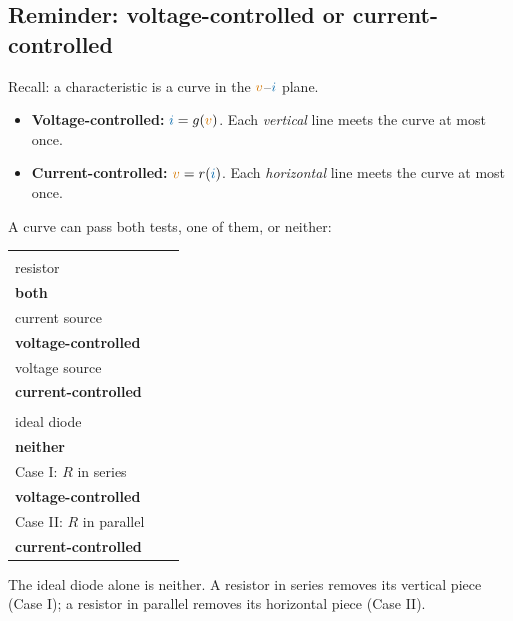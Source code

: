 \documentclass[11pt,a4paper]{article}
\newcommand{\Icol}[1]{\textcolor{ccur}{#1}}
\newcommand{\Vcol}[1]{\textcolor{cvolt}{#1}}
\newcommand{\pD}{\draw[crv] (-1.2,0) -- (0,0) -- (0,1.0);}                   %
\newcommand{\pframe}[2]{%
  \draw[vax] (-1.3,0) -- (1.3,0) node[right=0pt, font=\tiny, text=cvolt] {$v$};
  \draw[vax] (0,-1.1) -- (0,1.15) node[above=0pt, font=\tiny, text=ccur] {$i$};
  \node[font=\scriptsize, text=metugray] at (0,-1.4) {#2};}
\newcommand{\caseresa}{\draw[crv] (-1.2,0) -- (0,0) -- (1.1,0.88);}
\newcommand{\caseresb}{\draw[crv] (-1.1,-0.88) -- (0,0) -- (0,1.0);}
\newcommand{\cR}{\draw[crv] (-1.1,-0.85) -- (1.1,0.85);}
\newcommand{\cI}{\draw[crv] (-1.2,0.55) -- (1.2,0.55); \node[font=\tiny, anchor=south east] at (0,0.55) {$I$};}
\newcommand{\cE}{\draw[crv] (0.6,-1.0) -- (0.6,1.0); \node[font=\tiny, anchor=north west] at (0.6,0) {$E$};}
\begin{document}
\subsection{Reminder: voltage-controlled or current-controlled}\label{sec:control}

Recall: a characteristic is a curve in the $\Vcol{v}$--$\Icol{i}$ plane.
\begin{itemize}[itemsep=3pt]
  \item \textbf{Voltage-controlled:} $\Icol{i} = g(\Vcol{v})$. Each \emph{vertical} line meets the
        curve at most once.
  \item \textbf{Current-controlled:} $\Vcol{v} = r(\Icol{i})$. Each \emph{horizontal} line meets
        the curve at most once.
\end{itemize}
A curve can pass both tests, one of them, or neither:
\begin{center}
\small
\newcommand{\ccell}[3]{\begin{tikzpicture}[scale=0.62] \pframe{0}{} #1 \end{tikzpicture}\\[1pt] #2\\ \textbf{#3}}
\begin{tabular}{@{}>{\centering}p{3.6cm} >{\centering}p{3.6cm} >{\centering\arraybackslash}p{3.6cm}@{}}
\shortstack{\ccell{\cR}{resistor}{both}} &
\shortstack{\ccell{\cI}{current source}{voltage-controlled}} &
\shortstack{\ccell{\cE}{voltage source}{current-controlled}}\\[12pt]
\shortstack{\ccell{\pD}{ideal diode}{neither}} &
\shortstack{\ccell{\caseresa}{Case I: $R$ in series}{voltage-controlled}} &
\shortstack{\ccell{\caseresb}{Case II: $R$ in parallel}{current-controlled}}
\end{tabular}
\end{center}
The ideal diode alone is neither. A resistor in series removes its vertical piece (Case I); a
resistor in parallel removes its horizontal piece (Case II).
\end{document}
